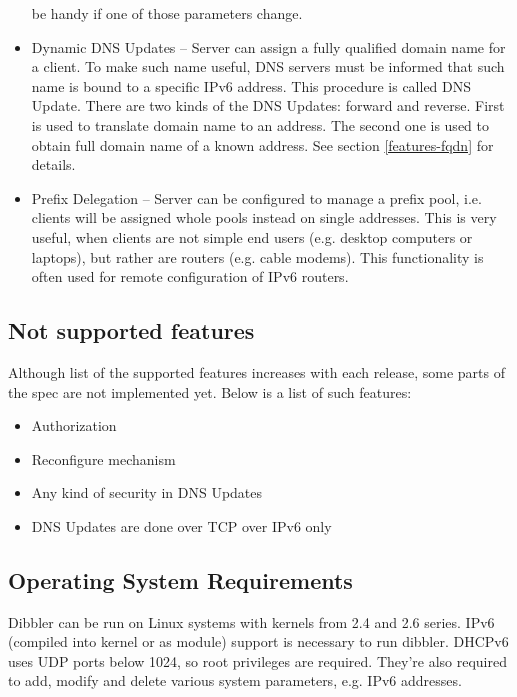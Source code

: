 \begin{itemize}
      be handy if one of those parameters change. \cite{draft-lifetime}
\item Dynamic DNS Updates -- Server can assign a fully qualified
      domain name for a client. To make such name useful, DNS servers
      must be informed that such name is bound to a specific IPv6
      address. This procedure is called DNS Update. There are two kinds
      of the DNS Updates: forward and reverse. First is used to
      translate domain name to an address. The second one is used to
      obtain full domain name of a known address. See section
      \ref{features-fqdn} for details. \cite{rfc4704}
\item Prefix Delegation -- Server can be configured to manage a prefix
      pool, i.e. clients will be assigned whole pools instead on
      single addresses. This is very useful, when clients are not
      simple end users (e.g. desktop computers or laptops), but rather
      are routers (e.g. cable modems). This functionality is often
      used for remote configuration of IPv6 routers. \cite{rfc3633}
\end{itemize}

\subsection{Not supported features}
Although list of the supported features increases with each release,
some parts of the spec are not implemented yet. Below is a list of such
features:

\begin{itemize}
 \item Authorization \cite{rfc3315}
 \item Reconfigure mechanism \cite{rfc3315}
 \item Any kind of security in DNS Updates \cite{rfc4704}
 \item DNS Updates are done over TCP over IPv6 only
\end{itemize}

\subsection{Operating System Requirements}
\label{requirements}
Dibbler can be run on Linux systems with kernels from 2.4 and 2.6
series. IPv6 (compiled into kernel or as module) support is necessary
to run dibbler. DHCPv6 uses UDP ports below 1024, so root privileges
are required. They're also required to add, modify and delete various
system parameters, e.g. IPv6 addresses.

